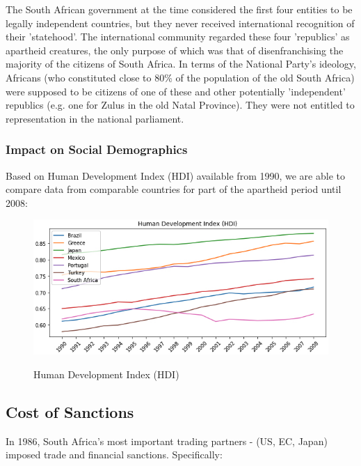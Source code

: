 \documentclass{elsarticle}
\begin{document}
The South African government at the time considered the first four entities to be legally independent countries, but they never received international recognition of their 'statehood'. The international community regarded these four 'republics' as apartheid creatures, the only purpose of which was that of disenfranchising the majority of the citizens of South Africa. In terms of the National Party's ideology, Africans (who constituted close to 80\% of the population of the old South Africa) were supposed to be
citizens of one of these and other potentially 'independent' republics (e.g. one for Zulus in the old Natal Province). They were not entitled to representation in the national parliament.

\subsubsection{Impact on Social Demographics}
Based on Human Development Index (HDI) available from 1990, we are able to compare data from comparable countries for part of the apartheid period until 2008:

\begin{figure}[!h]
    \centering
    \includegraphics[width=1\textwidth]{images/HDI.jpg}
    \caption{Human Development Index (HDI)}
    \label{fig:Human Development Index (HDI)}
    \cite{HDI2019}
\end{figure}


\subsection{Cost of Sanctions}
In 1986, South Africa's most important trading partners - (US, EC, Japan) imposed trade and financial sanctions. Specifically:
\end{document}
